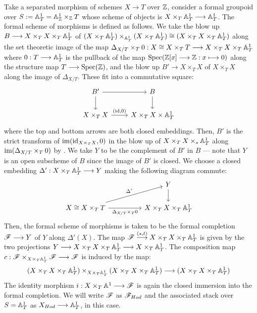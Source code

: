 \documentclass[11pt]{amsart}
\begin{document}
\begin{exm}
\label{exm:Hodge-st}
Take a separated morphism of schemes $X \to T$ over $\mathbb{Z}$,
consider a formal groupoid over $S := \mathbb{A}^1_T = \mathbb{A}^1_\mathbb{Z} \times_\mathbb{Z} T$
whose scheme of objects
is $X \times_T \bA^1_T \to \bA^1_T$. The formal scheme of morphisms is
defined as follows. We take the blow up $B \to X \times_T X \times_T \bA^1_T$ of
$(X \times_T \mathbb{A}^1_T) \times_{\mathbb{A}^1_T} (X \times_T \mathbb{A}^1_T)
\cong (X \times_T X \times_T \mathbb{A}^1_T)$ along the set theoretic image of the
map
$\Delta_{X/T} \times_T 0 : X \cong X \times_T T
\to X \times_T X \times_T \bA^1_T$ where
$0 : T \to \bA^1_T$ is the pullback of the map
$\Spec(\bZ[x] \to \bZ : x \mapsto 0)$ along the structure map
$T \to \Spec(\bZ)$,
and the blow up $B' \to X \times_T X$ of $X \times_T X$ along the image of
$\Delta_{X/T}$.
These fit into a commutative square:
\[\begin{tikzcd}
B' \ar[r] \ar[d] &
B \ar[d] \\
X \times_T X  \ar[r, "{(\id, 0)}"] & X \times_T X \times \bA^1_T
\end{tikzcd}\]
where the top and bottom arrows are both closed embeddings.
Then, $B'$ is the strict transform of $\mathrm{im}(\mathrm{id}_{X \times_T X}, 0)$
in the blow up of $X \times_T X \times_s \mathbb{A}^1_T$ along
$\mathrm{im}(\Delta_{X/T} \times_T 0)$ by
\cite[\href{https://stacks.math.columbia.edu/tag/080E}{Lemma 080E}]
{stacks-project}.
We take $Y$ to be the complement of $B'$ in $B$ --- note that
$Y$ is an open subscheme of $B$ since the image of $B'$ is closed.
We choose a closed embedding $\Delta' : X \times_T \bA^1_T \to Y$ making
the following diagram commute:
\[\begin{tikzcd}[column sep=huge]
& Y \ar[d] \\
X \cong X \times_T T
  \ar[r, "\Delta_{X/T} \times_T 0" below]
  \ar[ru, "\Delta'" above left] &
X \times_T X \times_T \bA^1_T
\end{tikzcd}\]
Then, the formal scheme of morphisms is taken to be the formal completion
$\sF \to Y$ of $Y$ along $\Delta'(X)$. The map
$\sF \to[{(s, t)}] X \times_T X \times_T \bA^1_T$ is given by the two
projections $Y \to X \times_T X \times_T \bA^1_T \to X \times_T \bA^1_T$.
The composition map $c : \sF \times_{X \times_T \bA^1_T} \sF \to \sF$
is induced by the map:
\[
(X \times_T X \times_T \bA^1_T) \times_{X \times_T \bA^1_T}
(X \times_T X \times_T \bA^1_T) \to (X \times_T X \times_T \bA^1_T)
\]
The identity morphism $i : X \times_T \bA^1 \to \sF$
is again the closed immersion into the formal completion.
We will write $\mathscr{F}$ as $\mathscr{F}_{Hod}$ and the associated stack over $S = \mathbb{A}^1_T$
as $X_{Hod} \to \bA^1_T$, in this case.
\end{exm}
\end{document}
